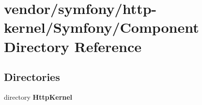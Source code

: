 \section{vendor/symfony/http-\/kernel/\+Symfony/\+Component Directory Reference}
\label{dir_425d489f439416285f6d5bcf6707174d}
\subsection*{Directories}
\begin{DoxyCompactItemize}
\item 
directory {\bf Http\+Kernel}
\end{DoxyCompactItemize}
